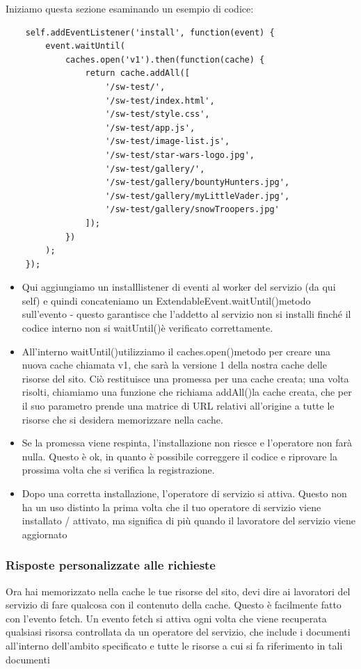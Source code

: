 \documentclass[italian]{article}
\begin{document}
Iniziamo questa sezione esaminando un esempio di codice:
\begin{lstlisting}
	self.addEventListener('install', function(event) {
		event.waitUntil(
			caches.open('v1').then(function(cache) {
				return cache.addAll([
					'/sw-test/',
					'/sw-test/index.html',
					'/sw-test/style.css',
					'/sw-test/app.js',
					'/sw-test/image-list.js',
					'/sw-test/star-wars-logo.jpg',
					'/sw-test/gallery/',
					'/sw-test/gallery/bountyHunters.jpg',
					'/sw-test/gallery/myLittleVader.jpg',
					'/sw-test/gallery/snowTroopers.jpg'
				]);
			})
		);
	});
\end{lstlisting}
\begin{itemize}
	\item Qui aggiungiamo un installlistener di eventi al worker del servizio (da qui self) e quindi concateniamo un ExtendableEvent.waitUntil()metodo sull'evento - questo garantisce che l'addetto al servizio non si installi finché il codice interno non si waitUntil()è verificato correttamente.
	\item All'interno waitUntil()utilizziamo il caches.open()metodo per creare una nuova cache chiamata v1, che sarà la versione 1 della nostra cache delle risorse del sito. Ciò restituisce una promessa per una cache creata; una volta risolti, chiamiamo una funzione che richiama addAll()la cache creata, che per il suo parametro prende una matrice di URL relativi all'origine a tutte le risorse che si desidera memorizzare nella cache.
	\item Se la promessa viene respinta, l'installazione non riesce e l'operatore non farà nulla. Questo è ok, in quanto è possibile correggere il codice e riprovare la prossima volta che si verifica la registrazione.
	\item Dopo una corretta installazione, l'operatore di servizio si attiva. Questo non ha un uso distinto la prima volta che il tuo operatore di servizio viene installato / attivato, ma significa di più quando il lavoratore del servizio viene aggiornato 
\end{itemize}

\subsubsection{Risposte personalizzate alle richieste}
Ora hai memorizzato nella cache le tue risorse del sito, devi dire ai lavoratori del servizio di fare qualcosa con il contenuto della cache. Questo è facilmente fatto con l'evento fetch.
Un evento fetch si attiva ogni volta che viene recuperata qualsiasi risorsa controllata da un operatore del servizio, che include i documenti all'interno dell'ambito specificato e tutte le risorse a cui si fa riferimento in tali documenti
\end{document}
